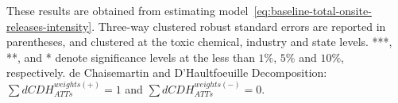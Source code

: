 \begin{table}[H]
    \centering
    \caption{Effect of the MW policy on Total Onsite Toxic Releases Intensity}
    \label{tab:baseline-total-onsite-releases-intensity}
    \begin{minipage}{18cm}
        \vspace{0.05in}
        These results are obtained from estimating model~\ref{eq:baseline-total-onsite-releases-intensity}. Three-way clustered robust standard errors are reported in parentheses, and clustered at the toxic chemical, industry and state levels. ***, **, and * denote significance levels at the less than $1\%$, $5\%$ and $10\%$, respectively. de Chaisemartin and D'Haultfoeuille Decomposition: $\sum dCDH_{ATTs}^{weights(+)} = 1$ and $\sum dCDH_{ATTs}^{weights(-)} = 0$.
    \end{minipage}
\end{table}